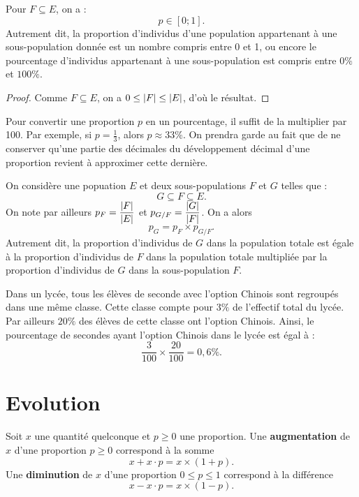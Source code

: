 \documentclass[a4paper, 12pt]{report}
\begin{document}
\begin{prop}
Pour $F \subseteq E$, on a :
\[ p \in [0;1] . \]
Autrement dit, la proportion d'individus d'une population appartenant à une sous-population donnée est un nombre compris entre 0 et 1,
ou encore le pourcentage d'individus appartenant à une sous-population est compris entre $0 \%$ et $100 \%$.
\end{prop}

\begin{proof}
Comme $F \subseteq E$, on a $0 \leq \lvert F\rvert \leq \lvert E\rvert$, d'où le résultat.
\end{proof}

\begin{rmq}
Pour convertir une proportion $p$ en un pourcentage, il suffit de la multiplier par 100. 
Par exemple, si $p=\frac13$, alors $p \approx 33 \%$. 
On prendra garde au fait que de ne conserver qu'une partie des décimales du développement décimal d'une proportion 
revient à approximer cette dernière.
\end{rmq}

\begin{prop}
On considère une popuation $E$ et deux sous-populations $F$ et $G$ telles que :
\[ G \subseteq F \subseteq E . \]
On note par ailleurs $p_F = \dfrac{\lvert F\rvert}{\lvert E\rvert}$ et $p_{G/F} = \dfrac{\lvert G\rvert}{\lvert F\rvert}$. On a alors 
\[p_{G} = p_F \times p_{G/F} . \]
Autrement dit, la proportion d'individus de $G$ dans la population totale est égale à la proportion d'individus de $F$ dans la population totale multipliée par la proportion d'individus de $G$ dans la sous-population $F$. 
\end{prop}

\begin{ex}
Dans un lycée, tous les élèves de seconde avec l'option Chinois sont regroupés dans une même classe.
Cette classe compte pour $3 \%$ de l'effectif total du lycée. 
Par ailleurs $20 \%$ des élèves de cette classe ont l'option Chinois.
Ainsi, le pourcentage de secondes ayant l'option Chinois dans le lycée est égal à :
\[ \frac3{100} \times \frac{20}{100} = 0,6 \% . \]
\end{ex}

\section{Evolution}

\begin{defn}
Soit $x$ une quantité quelconque et $p \geq 0$ une proportion.
Une \textbf{augmentation} de $x$ d'une proportion $p \geq 0$ correspond à la somme
\[ x + x\cdot p = x \times (1+p).\]
Une \textbf{diminution} de $x$ d'une proportion $0\leq p \leq 1$ correspond à la différence
\[ x - x\cdot p = x \times (1-p).\]
\end{defn}
\end{document}
